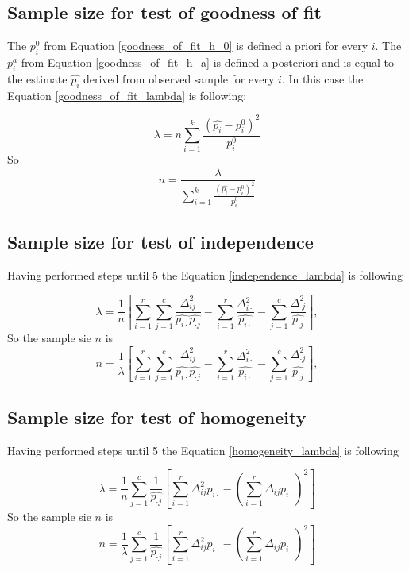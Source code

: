 \documentclass{article}
\begin{document}
\subsection{Sample size for test of goodness of fit}
The $p_i^0$ from Equation \ref{goodness_of_fit_h_0} is defined a priori for every $i$.
The $p_i^a$ from Equation \ref{goodness_of_fit_h_a} is defined a posteriori and is equal to the estimate $\widehat{p_{i}}$ derived from observed sample for every $i$.
In this case the Equation \ref{goodness_of_fit_lambda} is following:

\begin{equation}
    \lambda = n \sum_{i=1}^k \frac{\left(\widehat{p_{i}}-p_{i}^0\right)^2}{p_{i}^0}
\end{equation}
So
\begin{equation}
    n = \frac{\lambda}{\sum_{i=1}^k \frac{\left(\widehat{p_{i}}-p_{i}^0\right)^2}{p_{i}^0}}
\end{equation}


\subsection{Sample size for test of independence}

Having performed steps until 5 the Equation \ref{independence_lambda} is following

\begin{equation}
    \lambda = \frac{1}{n}\left[\sum_{i=1}^{r}\sum_{j=1}^c \frac{\Delta_{ij}^2}{\widehat{p_{i\cdot}}\widehat{p_{\cdot j}}} - \sum_{i=1}^{r}\frac{\Delta_{i \cdot}^2}{\widehat{p_{i \cdot}}} - \sum_{j=1}^{c}\frac{\Delta_{\cdot j}^2}{\widehat{p_{\cdot j}}}\right],
\end{equation}
So the sample sie $n$ is
\begin{equation}
    n = \frac{1}{\lambda}\left[\sum_{i=1}^{r}\sum_{j=1}^c \frac{\Delta_{ij}^2}{\widehat{p_{i\cdot}}\widehat{p_{\cdot j}}} - \sum_{i=1}^{r}\frac{\Delta_{i \cdot}^2}{\widehat{p_{i \cdot}}} - \sum_{j=1}^{c}\frac{\Delta_{\cdot j}^2}{\widehat{p_{\cdot j}}}\right],
\end{equation}

\subsection{Sample size for test of homogeneity}

Having performed steps until 5 the Equation \ref{homogeneity_lambda} is following

\begin{equation}
    \lambda = \frac{1}{n}\sum_{j=1}^{c}\frac{1}{\widehat{p_{\cdot j}}}\left[ \sum_{i=1}^{r} \Delta_{ij}^2 p_{i\cdot} -  \left(\sum_{i=1}^{r} \Delta_{ij} p_{i\cdot}\right)^2  \right]
\end{equation}
So the sample sie $n$ is
\begin{equation}
    n = \frac{1}{\lambda}\sum_{j=1}^{c}\frac{1}{\widehat{p_{\cdot j}}}\left[ \sum_{i=1}^{r} \Delta_{ij}^2 p_{i\cdot} -  \left(\sum_{i=1}^{r} \Delta_{ij} p_{i\cdot}\right)^2  \right]
\end{equation}
\end{document}
